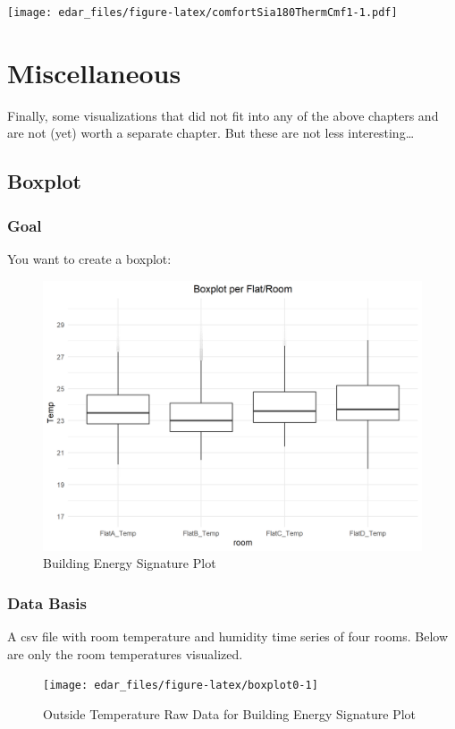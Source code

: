 \documentclass[
  a4paperpaper,
]{book}
\begin{document}
\texttt{[image: edar\_files/figure-latex/comfortSia180ThermCmf1-1.pdf]}

\hypertarget{miscellaneous}{%
\chapter{Miscellaneous}\label{miscellaneous}}

Finally, some visualizations that did not fit into any of the above chapters and are not (yet) worth a separate chapter. But these are not less interesting\ldots{}

\newpage

\hypertarget{boxplot}{%
\section{Boxplot}\label{boxplot}}

\hypertarget{goal-14}{%
\subsection{Goal}\label{goal-14}}

You want to create a boxplot:

\begin{figure}
\includegraphics[width=0.7\linewidth]{images/boxplot} \caption{Building Energy Signature Plot}\label{fig:unnamed-chunk-24}
\end{figure}

\hypertarget{data-basis-14}{%
\subsection{Data Basis}\label{data-basis-14}}

A csv file with room temperature and humidity time series of four rooms. Below are only the room temperatures visualized.

\begin{figure}
\texttt{[image: edar\_files/figure-latex/boxplot0-1]} \caption{Outside Temperature Raw Data for Building Energy Signature Plot}\label{fig:boxplot0}
\end{figure}
\end{document}
